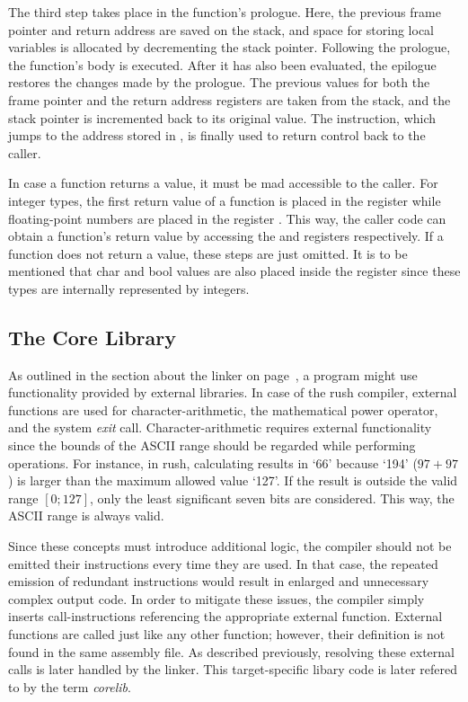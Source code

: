 The third step takes place in the function's prologue.
Here, the previous frame pointer and return address are saved on the stack,
and space for storing local variables is allocated by decrementing the stack pointer.
Following the prologue, the function's body is executed.
After it has also been evaluated, the epilogue restores the changes made by the prologue.
The previous values for both the frame pointer and the return address registers are taken from the stack,
and the stack pointer is incremented back to its original value.
The  instruction, which jumps to the address stored in , is finally used to return control back to the caller.

In case a function returns a value, it must be mad accessible to the caller.
For integer types, the first return value of a function is placed in the register 
while floating-point numbers are placed in the register .
This way, the caller code can obtain a function's return value by accessing the  and 
registers respectively. If a function does not return a value, these steps are just omitted.
It is to be mentioned that char and bool values are also placed inside the  register since these types are internally represented by integers.

\subsection{The Core Library}

As outlined in the section about the linker on page~\pageref{sec:linker},
a program might use functionality provided by external libraries.
In case of the rush \riscv{} compiler, external functions are used for character-arithmetic,
the mathematical power operator, and the system \emph{exit} call.
Character-arithmetic requires external functionality since the bounds of the ASCII range should be regarded while performing operations.
For instance, in rush, calculating  results in `66' because `194' ($97 + 97$) is larger than the maximum allowed value `127'.
If the result is outside the valid range $\left[0; 127\right]$, only the least significant seven bits are considered.
This way, the ASCII range is always valid.

Since these concepts must introduce additional logic, the compiler should not be emitted their instructions every time they are used.
In that case, the repeated emission of redundant instructions would result in enlarged and unnecessary complex output code.
In order to mitigate these issues, the compiler simply inserts call-instructions referencing the appropriate external function.
External functions are called just like any other function; however, their definition is not found in the same assembly file.
As described previously, resolving these external calls is later handled by the linker.
This target-specific libary code is later refered to by the term \emph{corelib}.

